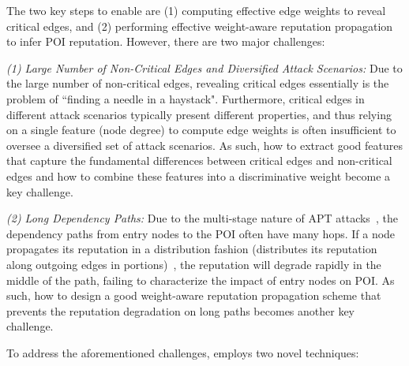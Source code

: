 The two key steps to enable \tool are (1) computing effective edge weights to reveal critical edges, and
(2) performing effective weight-aware reputation propagation to infer POI reputation.
However, there are two major challenges:


\emph{(1) Large Number of Non-Critical Edges and Diversified Attack Scenarios:} Due to the large number of non-critical edges, revealing critical edges essentially is the problem of ``finding a needle in a haystack". Furthermore, critical edges in different attack scenarios typically present different properties, and thus relying on a single feature (\eg node degree) to compute edge weights is often insufficient to oversee a diversified set of attack scenarios.
As such, how to extract good features that capture the fundamental differences between critical edges and non-critical edges and how to combine these features into a discriminative weight become a key challenge.


\emph{(2) Long Dependency Paths:} Due to the multi-stage nature of APT attacks~\cite{fireeye:anatomy,aptsymantec}, the dependency paths from entry nodes to the POI often have many hops. 
If a node propagates its reputation in a distribution fashion (\ie distributes its reputation along outgoing edges in portions)~\cite{Page:techreport:1998,cao2012sybilrank}, the reputation will degrade rapidly in the middle of the path, failing to characterize the impact of entry nodes on POI.
As such, how to design a good weight-aware reputation propagation scheme that prevents the reputation degradation on long paths becomes another key challenge.


To address the aforementioned challenges, \tool employs two novel techniques:

